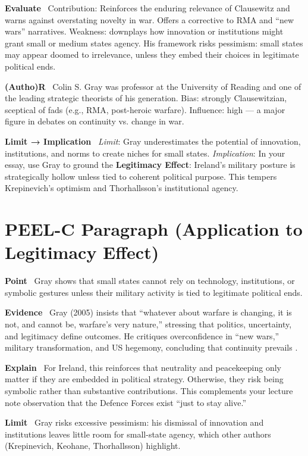 \textbf{Evaluate} \
Contribution: Reinforces the enduring relevance of Clausewitz and warns against overstating novelty in war. Offers a corrective to RMA and “new wars” narratives. Weakness: downplays how innovation or institutions might grant small or medium states agency. His framework risks pessimism: small states may appear doomed to irrelevance, unless they embed their choices in legitimate political ends.

\textbf{(Autho)R} \
Colin S. Gray was professor at the University of Reading and one of the leading strategic theorists of his generation. Bias: strongly Clausewitzian, sceptical of fads (e.g., RMA, post-heroic warfare). Influence: high — a major figure in debates on continuity vs. change in war.

\textbf{Limit → Implication} \
\textit{Limit}: Gray underestimates the potential of innovation, institutions, and norms to create niches for small states.
\textit{Implication}: In your essay, use Gray to ground the \textbf{Legitimacy Effect}: Ireland’s military posture is strategically hollow unless tied to coherent political purpose. This tempers Krepinevich’s optimism and Thorhallsson’s institutional agency.

\section*{PEEL-C Paragraph (Application to Legitimacy Effect)}

\textbf{Point} \
Gray shows that small states cannot rely on technology, institutions, or symbolic gestures unless their military activity is tied to legitimate political ends.

\textbf{Evidence} \
Gray (2005) insists that “whatever about warfare is changing, it is not, and cannot be, warfare’s very nature,” stressing that politics, uncertainty, and legitimacy define outcomes. He critiques overconfidence in “new wars,” military transformation, and US hegemony, concluding that continuity prevails \parencite{GRAY_2005}.

\textbf{Explain} \
For Ireland, this reinforces that neutrality and peacekeeping only matter if they are embedded in political strategy. Otherwise, they risk being symbolic rather than substantive contributions. This complements your lecture note observation that the Defence Forces exist “just to stay alive.”

\textbf{Limit} \
Gray risks excessive pessimism: his dismissal of innovation and institutions leaves little room for small-state agency, which other authors (Krepinevich, Keohane, Thorhallsson) highlight.


